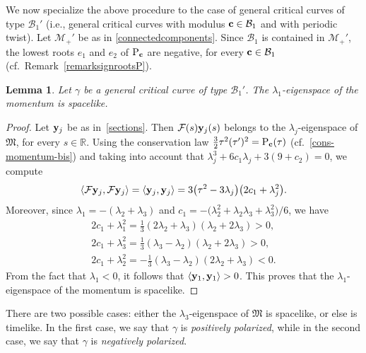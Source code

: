 \documentclass[pdftex]{sigma}
\numberwithin{equation}{section}
\newtheorem{Lemma}[Theorem]{Lemma}
\def\R{\mathbb{R}}
\begin{document}
We now specialize the above procedure to the case of general critical curves of type ${\mathcal B}_1'$ (i.e., general critical
curves with modulus ${\bf c}\in {\mathcal B}_1$ and with periodic twist). Let ${\mathcal M}_+'$ be as in
\eqref{connectedcomponents}.
Since ${\mathcal B}_1$ is contained in ${\mathcal M}_+'$, the lowest roots $e_1$ and $e_2$ of ${\rm P}_{{\bf c}}$ are negative,
for every ${\bf c}\in {\mathcal B}_1$ (cf.\ Remark~\ref{remarksignrootsP}).

\begin{Lemma} \label{Lemma1ss:integrability2}
Let $\gamma$ be a general critical curve of type ${\mathcal B}_1'$. The $\lambda_1$-eigenspace of the momentum is spacelike.
\end{Lemma}

\begin{proof}
Let ${\bf y}_j$ be as in~\eqref{sections}. Then ${\mathcal F}(s){\bf y}_j(s)$ belongs to the
$\lambda_j$-eigenspace of ${\mathfrak M}$, for every $s\in \R$.
Using the conservation law {$\frac32\tau^2 (\tau')^2={\rm P}_{{\bf c}}(\tau)$} (cf.~\eqref{cons-momentum-bis})
and taking into account that $\lambda_j^3+6c_1\lambda_j+3(9+c_2)=0$, {we} compute
\[
 \langle {\mathcal F}{\bf y}_j,{\mathcal F}{\bf y}_j\rangle
 = \langle {\bf y}_j,{\bf y}_j\rangle =3\big(\tau^2-3\lambda_j\big)\big(2c_1+\lambda_j^2\big).
\]
Moreover, since $\lambda_1=-(\lambda_2+\lambda_3)$ and $c_1=-\big(\lambda_2^2+\lambda_2\lambda_3+\lambda_3^2\big)/6$,
we have
\begin{gather*}
2c_1+\lambda_1^2=\frac{1}{3}(2\lambda_2+\lambda_3)(\lambda_2+2\lambda_3)>0,\\
2c_1+\lambda_3^2=\frac{1}{3}(\lambda_3-\lambda_2)(\lambda_2+2\lambda_3)>0,\\
2c_1+\lambda_2^2=-\frac{1}{3}(\lambda_3-\lambda_2)(2\lambda_2+\lambda_3)<0.
\end{gather*}
From the fact that $\lambda_1<0$, it follows that $\langle {\bf y}_1,{\bf y}_1\rangle > 0$.
This proves that the $\lambda_1$-eigenspace of the momentum is spacelike.
\end{proof}

\begin{Definition}
There are two possible cases: either the $\lambda_3$-eigenspace of ${\mathfrak M}$ is spacelike, or else is timelike.
In the first case, we say that $\gamma$ is \emph{positively polarized}, while in the second case, we say that
$\gamma$ is \emph{negatively polarized}.
\end{Definition}
\end{document}
